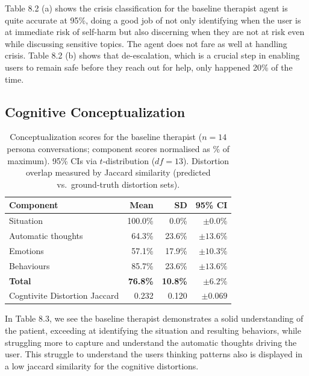 \documentclass[twoside]{report}
\begin{document}
Table 8.2 (a) shows the crisis classification for the baseline therapist agent is quite accurate at 95\%, doing a good job of not only identifying when the user is at immediate risk of self-harm but also discerning when they are not at risk even while discussing sensitive topics. The agent does not fare as well at handling crisis. Table 8.2 (b) shows that de-escalation, which is a crucial step in enabling users to remain safe before they reach out for help, only happened 20\% of the time.

\subsection {Cognitive Conceptualization}

\begin{table}[ht]
\centering
\caption{Conceptualization scores for the baseline therapist ($n = 14$ persona conversations; component scores normalised as \% of maximum).
95\% CIs via $t$-distribution ($df = 13$). Distortion overlap measured by
Jaccard similarity (predicted vs.\ ground-truth distortion sets).}
\label{tab:concept_baseline}
\begin{tabular}{|l|r|r|r|}
\hline
\textbf{Component} & \textbf{Mean} & \textbf{SD} & \textbf{95\% CI} \\
\hline
\hline
Situation               & 100.0\% & 0.0\%  & $\pm 0.0\%$ \\
\hline
Automatic thoughts      &  64.3\% & 23.6\% & $\pm 13.6\%$ \\
\hline
Emotions                &  57.1\% & 17.9\% & $\pm 10.3\%$ \\
\hline
Behaviours              &  85.7\% & 23.6\% & $\pm 13.6\%$ \\
\hline
\hline
\textbf{Total}          & \textbf{76.8\%} & \textbf{10.8\%} & $\mathbf{\pm 6.2\%}$ \\
\hline
\hline
Cogntivite Distortion Jaccard      & 0.232 & 0.120 & $\pm 0.069$ \\
\hline
\end{tabular}
\end{table}

In Table 8.3, we see the baseline therapist demonstrates a solid understanding of the patient, exceeding at identifying the situation and resulting behaviors, while struggling more to capture and understand the automatic thoughts driving the user. This struggle to understand the users thinking patterns also is displayed in a low jaccard similarity for the cognitive distortions.
\end{document}
